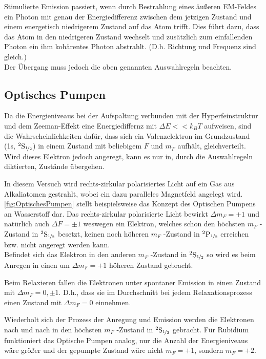         Stimulierte Emission passiert, wenn durch Bestrahlung eines äußeren EM-Feldes ein Photon mit genau der Energiedifferenz zwischen dem jetzigen Zustand und einem energetisch niedrigerem Zustand auf das Atom trifft. Dies führt dazu, dass das Atom in den niedrigeren Zustand wechselt und zusätzlich zum einfallenden Photon ein ihm kohärentes Photon abstrahlt. (D.h. Richtung und Frequenz sind gleich.)\\
        Der Übergang muss jedoch die oben genannten Auswahlregeln beachten.

    \subsection{Optisches Pumpen}        
        Da die Energieniveaus bei der Aufspaltung verbunden mit der Hyperfeinstruktur und dem Zeeman-Effekt eine Energiediffernz mit $\Delta E << k_B T$ aufweisen, sind die Wahrscheinlichkeiten dafür, dass sich ein Valenzelektron im Grundzustand (1s, $^2\text{S}_{\nicefrac{1}{2}}$) in einem Zustand mit beliebigem $F$ und $m_F$ aufhält, gleichverteilt. Wird dieses Elektron jedoch angeregt, kann es nur in, durch die Auswahlregeln diktierten, Zustände übergehen.

        In diesem Versuch wird rechts-zirkular polarisiertes Licht auf ein Gas aus Alkaliatomen gestrahlt, wobei ein dazu paralleles Magnetfeld angelegt wird. \autoref{fig:OptischesPumpen} stellt beispielsweise das Konzept des Optischen Pumpens an Wasserstoff dar. Das rechts-zirkular polarisierte Licht bewirkt $\Delta m_F = +1$ und natürlich auch $\Delta F = \pm 1$ weswegen ein Elektron, welches schon den höchsten $m_F$ -Zustand in $^2\text{S}_{\nicefrac{1}{2}}$ besetzt, keinen noch höheren $m_F$ -Zustand in $^2\text{P}_{\nicefrac{1}{2}}$ erreichen bzw. nicht angeregt werden kann.\\
        Befindet sich das Elektron in den anderen $m_F$ -Zustand in $^2\text{S}_{\nicefrac{1}{2}}$ so wird es beim Anregen in einen um $\Delta m_F = +1$ höheren Zustand gebracht.

        Beim Relaxieren fallen die Elektronen unter spontaner Emission in einen Zustand mit $\Delta m_F = 0, \pm 1$. D.h., dass sie im Durchschnitt bei jedem Relaxationsprozess einen Zustand mit $\Delta m_F = 0$ einnehmen.

        Wiederholt sich der Prozess der Anregung und Emission werden die Elektronen nach und nach in den höchsten $m_F$ -Zustand in $^2\text{S}_{\nicefrac{1}{2}}$ gebracht. Für Rubidium funktioniert das Optische Pumpen analog, nur die Anzahl der Energieniveaus wäre größer und der gepumpte Zustand wäre nicht $m_F = +1$, sondern $m_F = +2$.
    

